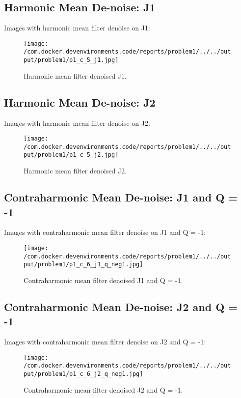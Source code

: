 \documentclass{article}%
\begin{document}
%
\subsection{Harmonic Mean De{-}noise: J1}%
\label{subsec:HarmonicMeanDe{-}noiseJ1}%
Images with harmonic mean filter denoise on J1:%


\begin{figure}[h!]%
\centering%
\texttt{[image: /com.docker.devenvironments.code/reports/problem1/../../output/problem1/p1\_c\_5\_j1.jpg]}%
\caption{Harmonic mean filter denoised J1.}%
\end{figure}

%
\subsection{Harmonic Mean De{-}noise: J2}%
\label{subsec:HarmonicMeanDe{-}noiseJ2}%
Images with harmonic mean filter denoise on J2:%


\begin{figure}[h!]%
\centering%
\texttt{[image: /com.docker.devenvironments.code/reports/problem1/../../output/problem1/p1\_c\_5\_j2.jpg]}%
\caption{Harmonic mean filter denoised J2.}%
\end{figure}

%
\subsection{Contraharmonic Mean De{-}noise: J1 and Q = {-}1}%
\label{subsec:ContraharmonicMeanDe{-}noiseJ1andQ={-}1}%
Images with contraharmonic mean filter denoise on J1 and Q = {-}1:%


\begin{figure}[h!]%
\centering%
\texttt{[image: /com.docker.devenvironments.code/reports/problem1/../../output/problem1/p1\_c\_6\_j1\_q\_neg1.jpg]}%
\caption{Contraharmonic mean filter denoised J1 and Q = {-}1.}%
\end{figure}

%
\subsection{Contraharmonic Mean De{-}noise: J2 and Q = {-}1}%
\label{subsec:ContraharmonicMeanDe{-}noiseJ2andQ={-}1}%
Images with contraharmonic mean filter denoise on J2 and Q = {-}1:%


\begin{figure}[h!]%
\centering%
\texttt{[image: /com.docker.devenvironments.code/reports/problem1/../../output/problem1/p1\_c\_6\_j2\_q\_neg1.jpg]}%
\caption{Contraharmonic mean filter denoised J2 and Q = {-}1.}%
\end{figure}
\end{document}
